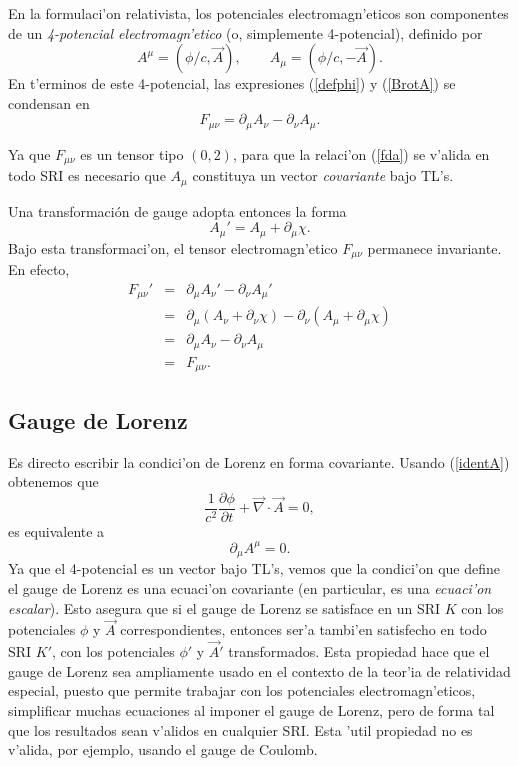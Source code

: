 En la formulaci'on relativista, los potenciales electromagn'eticos son componentes de un  \textit{4-potencial electromagn'etico} (o, simplemente 4-potencial), definido por
\begin{equation}
A^\mu =(\phi/c,\vec{A}), \qquad A_\mu =(\phi/c,-\vec{A}). \label{identA}
\end{equation}
En t'erminos de este 4-potencial, las expresiones (\ref{defphi}) y (\ref{BrotA}) se condensan en
\begin{equation}
\boxed{F_{\mu \nu}=\partial_\mu A_{\nu}-\partial_{\nu}A_\mu.} \label{fda}
\end{equation}

Ya que $F_{\mu\nu}$ es un tensor tipo $(0,2)$, para que la relaci'on (\ref{fda})
se v'alida en todo SRI es necesario que $A_\mu$ constituya un vector
\textit{covariante} bajo TL's.

Una transformaci\'on de gauge adopta entonces la forma
\begin{equation}
\boxed{A_\mu' = A_\mu  + \partial_\mu  \chi .}
\end{equation}
Bajo esta transformaci'on, el tensor electromagn'etico $F_{\mu \nu}$ permanece
invariante. En efecto,
\begin{eqnarray}
F_{\mu\nu}'&=&\partial_\mu A_{\nu}'-\partial_{\nu}A_\mu '  \\
&=&\partial_\mu (A_{\nu}+\partial_{\nu}
\chi)-\partial_{\nu}(A_\mu +\partial_\mu  \chi)\\
&=&\partial_\mu A_{\nu}-\partial_{\nu}A_\mu  \\
&=&F_{\mu \nu}.
\end{eqnarray}

\subsection{Gauge de Lorenz}
Es directo escribir la condici'on de Lorenz en forma covariante. Usando
(\ref{identA}) obtenemos que
\begin{equation}
\frac{1}{c^2}\frac{\partial\phi}{\partial t}+\vec{\nabla}\cdot\vec{A}=0,
\end{equation}
es equivalente a
\begin{equation}
\partial_\mu A^\mu=0. \label{gLA}
\end{equation}
Ya que el 4-potencial es un vector bajo TL's, vemos que la condici'on que define el gauge de Lorenz es una ecuaci'on covariante (en particular, es una \textit{ecuaci'on escalar}). Esto asegura que si el gauge de Lorenz se satisface en un SRI $K$ con los potenciales $\phi$ y $\vec{A}$ correspondientes, entonces ser'a tambi'en satisfecho en todo SRI $K'$, con los potenciales $\phi'$ y $\vec{A}'$ transformados. Esta propiedad hace que el gauge de Lorenz sea ampliamente usado en el contexto de la teor'ia de relatividad especial, puesto que permite trabajar con los potenciales electromagn'eticos, simplificar muchas ecuaciones al imponer el gauge de Lorenz, pero de forma tal que los resultados sean v'alidos en cualquier SRI. Esta 'util propiedad no es v'alida, por ejemplo, usando el gauge de Coulomb.


